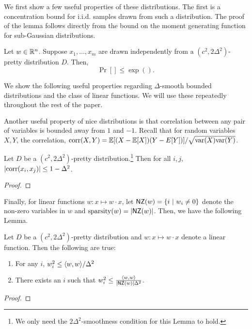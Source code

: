 We first show a few useful properties of these distributions. The first is a
concentration bound for i.i.d. samples drawn from such a distribution. The proof of
the lemma follows directly from the bound on the moment generating function for
sub-Gaussian distributions.
\begin{lemma}
Let $w \in \mathbb{R}^n$. Suppose $x_1, \ldots, x_m$ are drawn independently from
a $(c^2, 2 \Delta^2)$-pretty distribution $D$. Then,
\[ 
\Pr[ ] \leq \exp( ).
\]
\end{lemma}

We show the following useful properties regarding $\Delta$-smooth bounded
distributions and the class of linear functions. We will use these repeatedly
throughout the rest of the paper.

Another useful property of nice distributions is that correlation between any
pair of variables is bounded away from $1$ and $-1$.  Recall that for random
variables $X, Y$, the correlation, $\mathrm{corr}(X, Y) = \mathbb{E}[(X - \mathbb{E}[X]) (Y -
E[Y])]/\sqrt{\mathrm{var}(X) \mathrm{var}(Y)}$. 

\begin{lemma} Let $D$ be a $(c^2, 2 \Delta^2)$-pretty distribution.\footnote{We
only need the $2 \Delta^2$-smoothness condition for this Lemma to hold.} Then
for all $i, j$, $|\mathrm{corr}(x_i, x_j)| \leq 1 - \Delta^2$.
\end{lemma}
\begin{proof}

\end{proof}

Finally, for linear functions $w : x \mapsto w \cdot x$, let $\mathsf{NZ}(w) = \{ i ~|~
w_i \neq 0 \}$ denote the non-zero variables in $w$ and $\mathrm{sparsity}(w) =
|\mathsf{NZ}(w)|$. Then, we have the following Lemma.

\begin{lemma} Let $D$ be a $(c^2, 2 \Delta^2)$-pretty distribution and $w : x
\mapsto w \cdot x$ denote a linear function. Then the following are true:
\begin{enumerate}
\item For any $i$, $w^2_i \leq \langle w, w \rangle/\Delta^2$
\item There exists an $i$ such that $w^2_i \leq \frac{\langle w, w \rangle}{|\mathsf{NZ}(w)| \Delta^2}$.
\end{enumerate}
\end{lemma}
\begin{proof}

\end{proof}


